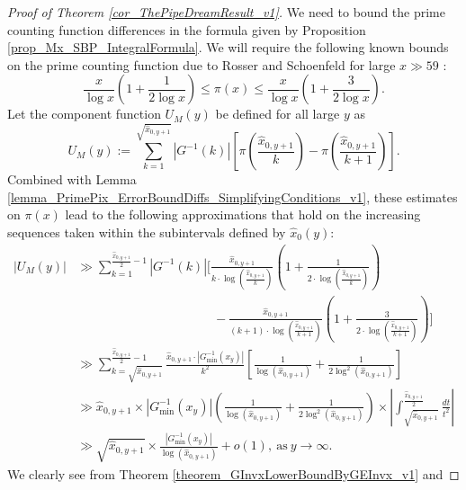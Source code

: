 \documentclass[11pt,reqno,a4letter]{article}
\numberwithin{figure}{section}
\numberwithin{table}{section}
\theoremstyle{plain}
\numberwithin{theorem}{section}
\theoremstyle{definition}
\begin{document}
\begin{proof}[Proof of Theorem \ref{cor_ThePipeDreamResult_v1}]
We need to bound the prime counting function differences in the formula given by 
Proposition \ref{prop_Mx_SBP_IntegralFormula}. 
We will require the following known bounds on the prime counting 
function due to Rosser and Schoenfeld for large $x \gg 59$ 
\cite[Thm.\ 1]{ROSSER-SCHOENFELD-1962}: 
\begin{equation} 
\label{eqn_RosserSchoenfeld_PrimePixBounds_v2} 
\frac{x}{\log x}\left(1 + \frac{1}{2\log x}\right) \leq \pi(x) \leq 
     \frac{x}{\log x}\left(1 + \frac{3}{2 \log x}\right). 
\end{equation} 
Let the component function $U_M(y)$ be defined for all large $y$ as 
\[
U_M(y) := \sum_{k=1}^{\sqrt{\hat{x}_{0,y+1}}} |G^{-1}(k)| \left[ 
     \pi\left(\frac{\hat{x}_{0,y+1}}{k}\right) - 
     \pi\left(\frac{\hat{x}_{0,y+1}}{k+1}\right)
     \right]. 
\]
Combined with Lemma \ref{lemma_PrimePix_ErrorBoundDiffs_SimplifyingConditions_v1}, 
these estimates on $\pi(x)$ lead to the following approximations that hold on the 
increasing sequences taken within the subintervals defined by $\widehat{x}_0(y)$: 
\begin{align*} 
|U_M(y)| & \gg \sum_{k=1}^{\frac{\hat{x}_{0,y+1}}{2}-1} |G^{-1}(k)| \Biggl[ 
     \frac{\hat{x}_{0,y+1}}{k \cdot \log\left(\frac{\hat{x}_{0,y+1}}{k}\right)} \left(1 + 
     \frac{1}{2 \cdot \log\left(\frac{\hat{x}_{0,y+1}}{k}\right)}\right) \\ 
     & \phantom{\gg \sum_{k=1}^{\frac{\hat{x}_{0,y+1}}{2}-1} |G^{-1}(k)| \Biggl[\ } - 
     \frac{\hat{x}_{0,y+1}}{(k+1) \cdot \log\left(\frac{\hat{x}_{0,y+1}}{k+1}\right)} \left(1 + 
     \frac{3}{2 \cdot \log\left(\frac{\hat{x}_{0,y+1}}{k+1}\right)}\right)
     \Biggr] \\ 
     & \gg 
     \sum_{k=\sqrt{\hat{x}_{0,y+1}}}^{\frac{\hat{x}_{0,y+1}}{2}-1} \frac{\hat{x}_{0,y+1} \cdot 
     |G_{\min}^{-1}(x_y)|}{k^2} \left[ 
     \frac{1}{\log(\hat{x}_{0,y+1})} + \frac{1}{2 \log^2(\hat{x}_{0,y+1})}\right] \\ 
     & \gg \hat{x}_{0,y+1} \times |G_{\min}^{-1}(x_y)| \left(\frac{1}{\log(\hat{x}_{0,y+1})} + 
     \frac{1}{2 \log^2(\hat{x}_{0,y+1})}\right) \times 
     \left\lvert \int_{\sqrt{\hat{x}_{0,y+1}}}^{\frac{\hat{x}_{0,y+1}}{2}} 
     \frac{dt}{t^2} \right\rvert \\ 
     & \gg \sqrt{\hat{x}_{0,y+1}} \times 
     \frac{|G_{\min}^{-1}(x_y)|}{\log(\hat{x}_{0,y+1})} 
     + o(1), \mathrm{\ as\ } y \rightarrow \infty. 
\end{align*} 
We clearly see from Theorem \ref{theorem_GInvxLowerBoundByGEInvx_v1} and 

\end{proof}
\end{document}

